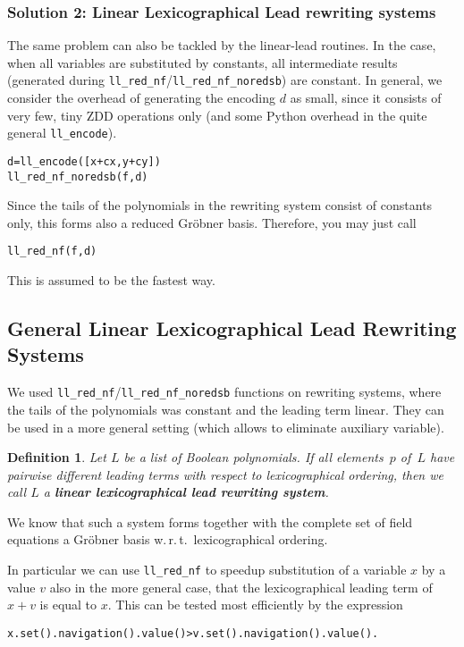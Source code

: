 \documentclass[]{article}
\newcommand{\Groebner}{Gr\"{o}bner\xspace}
\newcounter{thm}
\newtheorem{definition}[thm]{Definition}
\begin{document}
\subsubsection{Solution 2: Linear Lexicographical Lead rewriting systems}
The same problem can also be tackled by the linear-lead routines. In the case, when
all variables are substituted by  constants, all intermediate results
(generated during \verb|ll_red_nf|/\verb|ll_red_nf_noredsb|) are constant.
In general, we consider the overhead of generating the encoding $d$ as small, 
since it consists of very few, tiny ZDD operations only (and some Python overhead in the quite general \verb|ll_encode|).
\begin{verbatim}
d=ll_encode([x+cx,y+cy])
ll_red_nf_noredsb(f,d)
\end{verbatim}
%
%
Since the tails of the polynomials in the rewriting system   consist of
constants only, this forms also a
reduced \Groebner basis. Therefore, you may just call
\begin{verbatim}
ll_red_nf(f,d)   
\end{verbatim}
%
This is assumed to be the fastest way.
%


\subsection{General Linear Lexicographical Lead Rewriting Systems}
\label{linear-lexicographical-lead-rewriting-systems}
We used \verb|ll_red_nf|/\verb|ll_red_nf_noredsb| functions on rewriting systems, where the tails of the polynomials was constant and the leading term linear.
They can be used in a more general setting (which allows to eliminate auxiliary variable).
\begin{definition}
Let $L$ be a list of Boolean polynomials.
If all elements~$p$ of~$L$ have pairwise different leading terms with respect to lexicographical ordering,
then we call $L$ a \textbf{linear lexicographical lead rewriting system}.
\end{definition}
We know that such a system forms together with the complete set of field
equations a \Groebner basis w.\,r.\,t.\ lexicographical ordering.

In particular we can use \verb|ll_red_nf| to speedup substitution of a variable $x$ by a value $v$ also in the more general case, that the lexicographical leading term of $x+v$ is equal to $x$.
This can be tested most efficiently by the expression
\begin{verbatim}
x.set().navigation().value()>v.set().navigation().value().
\end{verbatim}
\end{document}
